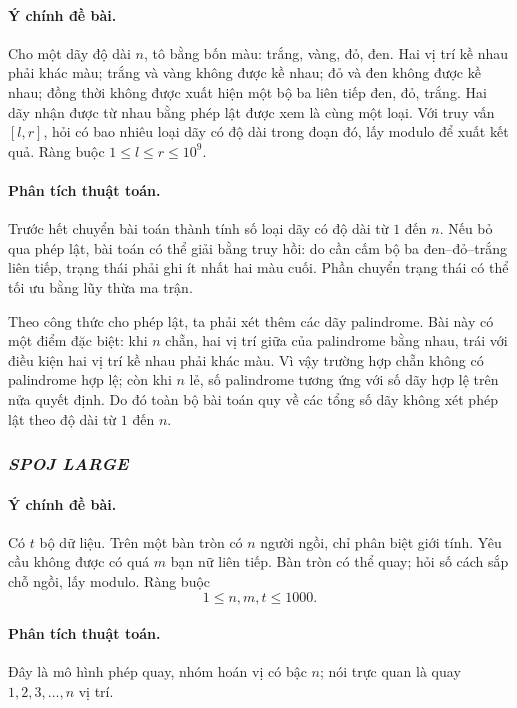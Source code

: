 \documentclass[11pt]{article}
\begin{document}
\paragraph{Ý chính đề bài.}
Cho một dãy độ dài \(n\), tô bằng bốn màu: trắng, vàng, đỏ, đen. Hai vị trí kề
nhau phải khác màu; trắng và vàng không được kề nhau; đỏ và đen không được kề
nhau; đồng thời không được xuất hiện một bộ ba liên tiếp đen, đỏ, trắng. Hai
dãy nhận được từ nhau bằng phép lật được xem là cùng một loại. Với truy vấn
\([l,r]\), hỏi có bao nhiêu loại dãy có độ dài trong đoạn đó, lấy modulo để
xuất kết quả. Ràng buộc \(1\le l\le r\le 10^9\).

\paragraph{Phân tích thuật toán.}
Trước hết chuyển bài toán thành tính số loại dãy có độ dài từ \(1\) đến \(n\).
Nếu bỏ qua phép lật, bài toán có thể giải bằng truy hồi: do cần cấm bộ ba
đen--đỏ--trắng liên tiếp, trạng thái phải ghi ít nhất hai màu cuối. Phần
chuyển trạng thái có thể tối ưu bằng lũy thừa ma trận.

Theo công thức cho phép lật, ta phải xét thêm các dãy palindrome. Bài này có
một điểm đặc biệt: khi \(n\) chẵn, hai vị trí giữa của palindrome bằng nhau,
trái với điều kiện hai vị trí kề nhau phải khác màu. Vì vậy trường hợp chẵn
không có palindrome hợp lệ; còn khi \(n\) lẻ, số palindrome tương ứng với số
dãy hợp lệ trên nửa quyết định. Do đó toàn bộ bài toán quy về các tổng số dãy
không xét phép lật theo độ dài từ \(1\) đến \(n\).

\subsubsection{\emph{SPOJ LARGE}}

\paragraph{Ý chính đề bài.}
Có \(t\) bộ dữ liệu. Trên một bàn tròn có \(n\) người ngồi, chỉ phân biệt giới
tính. Yêu cầu không được có quá \(m\) bạn nữ liên tiếp. Bàn tròn có thể quay;
hỏi số cách sắp chỗ ngồi, lấy modulo. Ràng buộc
\[
  1\le n,m,t\le 1000.
\]

\paragraph{Phân tích thuật toán.}
Đây là mô hình phép quay, nhóm hoán vị có bậc \(n\); nói trực quan là quay
\(1,2,3,\ldots,n\) vị trí.
\end{document}
